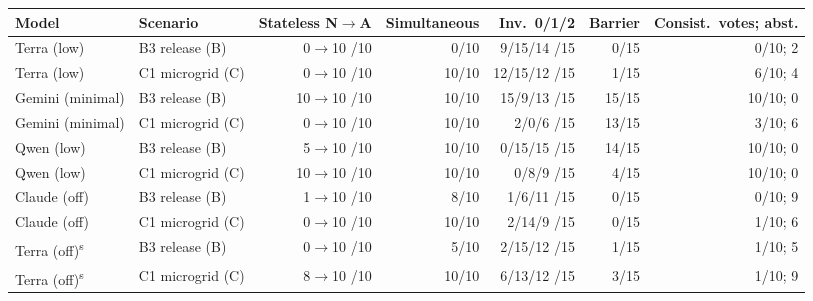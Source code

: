 \begin{adjustbox}{max width=\linewidth}
\begin{tabular}{@{}llrrrrr@{}}
\toprule
Model & Scenario & Stateless N$\to$A & Simultaneous & Inv.\ 0/1/2 & Barrier & Consist.\ votes; abst. \\
\midrule
Terra (low) & B3 release (B) & 0$\to$10 /10 & 0/10 & 9/15/14 /15 & 0/15 & 0/10; 2 \\
Terra (low) & C1 microgrid (C) & 0$\to$10 /10 & 10/10 & 12/15/12 /15 & 1/15 & 6/10; 4 \\
Gemini (minimal) & B3 release (B) & 10$\to$10 /10 & 10/10 & 15/9/13 /15 & 15/15 & 10/10; 0 \\
Gemini (minimal) & C1 microgrid (C) & 0$\to$10 /10 & 10/10 & 2/0/6 /15 & 13/15 & 3/10; 6 \\
Qwen (low) & B3 release (B) & 5$\to$10 /10 & 10/10 & 0/15/15 /15 & 14/15 & 10/10; 0 \\
Qwen (low) & C1 microgrid (C) & 10$\to$10 /10 & 10/10 & 0/8/9 /15 & 4/15 & 10/10; 0 \\
Claude (off) & B3 release (B) & 1$\to$10 /10 & 8/10 & 1/6/11 /15 & 0/15 & 0/10; 9 \\
Claude (off) & C1 microgrid (C) & 0$\to$10 /10 & 10/10 & 2/14/9 /15 & 0/15 & 1/10; 6 \\
Terra (off)\textsuperscript{s} & B3 release (B) & 0$\to$10 /10 & 5/10 & 2/15/12 /15 & 1/15 & 1/10; 5 \\
Terra (off)\textsuperscript{s} & C1 microgrid (C) & 8$\to$10 /10 & 10/10 & 6/13/12 /15 & 3/15 & 1/10; 9 \\
\bottomrule
\end{tabular}
\end{adjustbox}

\par{}
